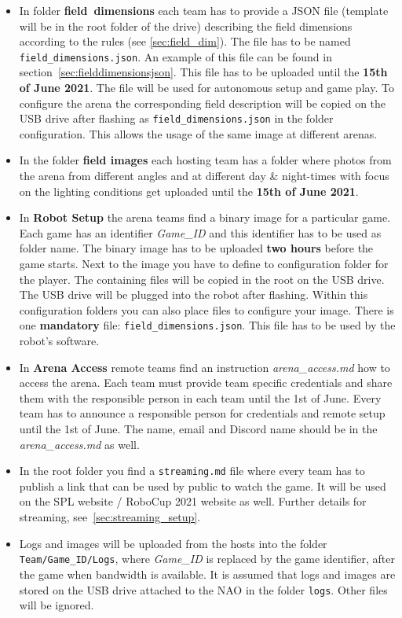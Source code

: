 \begin{itemize}
    \item In folder \textbf{field\ dimensions} each team has to provide a JSON file (template will be in the root folder of the drive) describing the field dimensions according to the rules (see \ref{sec:field_dim}). The file has to be named \texttt{field\_dimensions.json}. An example of this file can be found in section~\ref{sec:fielddimensionsjson}. This file has to be uploaded until the \textbf{15th of June 2021}. The file will be used for autonomous setup and game play. To configure the arena the corresponding field description will be copied on the USB drive after flashing as \texttt{field\_dimensions.json} in the folder configuration. This allows the usage of the same image at different arenas.
    \item In the folder \textbf{field images} each hosting team has a folder where photos from the arena from different angles and at different day \& night-times with focus on the lighting conditions get uploaded until the \textbf{15th of June 2021}.
    \item In \textbf{Robot Setup} the arena teams find a binary image for a particular game. Each game has an identifier \textit{Game\_ID} and this identifier has to be used as folder name. The binary image has to be uploaded \textbf{two hours} before the game starts. Next to the image you have to define to configuration folder for the player. The containing files will be copied in the root on the USB drive. The USB drive will be plugged into the robot after flashing. Within this configuration folders you can also place files to configure your image. There is one \textbf{mandatory} file: \texttt{field\_dimensions.json}. This file has to be used by the robot's software.
    \item In \textbf{Arena Access} remote teams find an instruction \textit{arena\_access.md} how to access the arena. Each team must provide team specific credentials and share them with the responsible person in each team until the 1st of June. Every team has to announce a responsible person for credentials and remote setup until the 1st of June. The name, email and Discord name should be in the \textit{arena\_access.md} as well.
    \item In the root folder you find a \texttt{streaming.md} file where every team has to publish a link that can be used by public to watch the game. It will be used on the SPL website / RoboCup 2021 website as well. Further details for streaming, see~\ref{sec:streaming_setup}.
	\item Logs and images will be uploaded from the hosts into the folder \texttt{Team/Game\_ID/Logs}, where \textit{Game\_ID} is replaced by the game identifier, after the game when bandwidth is available. It is assumed that logs and images are stored on the USB drive attached to the NAO in the folder \texttt{logs}. Other files will be ignored.

\end{itemize}

